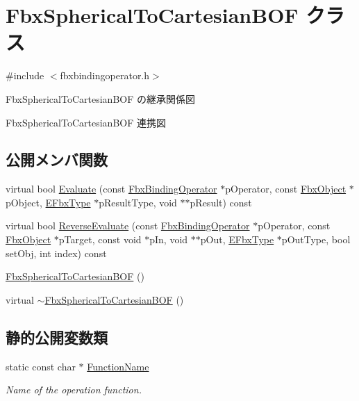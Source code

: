 \hypertarget{class_fbx_spherical_to_cartesian_b_o_f}{}\section{Fbx\+Spherical\+To\+Cartesian\+B\+OF クラス}
\label{class_fbx_spherical_to_cartesian_b_o_f}


{\ttfamily \#include $<$fbxbindingoperator.\+h$>$}



Fbx\+Spherical\+To\+Cartesian\+B\+OF の継承関係図


Fbx\+Spherical\+To\+Cartesian\+B\+OF 連携図
\subsection*{公開メンバ関数}
\begin{DoxyCompactItemize}
\item 
virtual bool \hyperlink{class_fbx_spherical_to_cartesian_b_o_f_a0c53f8982c1e6c6ca7772ab2503f7d2d}{Evaluate} (const \hyperlink{class_fbx_binding_operator}{Fbx\+Binding\+Operator} $\ast$p\+Operator, const \hyperlink{class_fbx_object}{Fbx\+Object} $\ast$p\+Object, \hyperlink{fbxpropertytypes_8h_a73913a5ddfb20e57c6f25e9e6784bd92}{E\+Fbx\+Type} $\ast$p\+Result\+Type, void $\ast$$\ast$p\+Result) const
\item 
virtual bool \hyperlink{class_fbx_spherical_to_cartesian_b_o_f_a05d7c7e0e46df48e22f01f0b09a86bae}{Reverse\+Evaluate} (const \hyperlink{class_fbx_binding_operator}{Fbx\+Binding\+Operator} $\ast$p\+Operator, const \hyperlink{class_fbx_object}{Fbx\+Object} $\ast$p\+Target, const void $\ast$p\+In, void $\ast$$\ast$p\+Out, \hyperlink{fbxpropertytypes_8h_a73913a5ddfb20e57c6f25e9e6784bd92}{E\+Fbx\+Type} $\ast$p\+Out\+Type, bool set\+Obj, int index) const
\item 
\hyperlink{class_fbx_spherical_to_cartesian_b_o_f_a6a34b2c35046672a7ed9f9edf68cfebb}{Fbx\+Spherical\+To\+Cartesian\+B\+OF} ()
\item 
virtual \hyperlink{class_fbx_spherical_to_cartesian_b_o_f_a1521a286e12379f2f0f4b6f67b7f11eb}{$\sim$\+Fbx\+Spherical\+To\+Cartesian\+B\+OF} ()
\end{DoxyCompactItemize}
\subsection*{静的公開変数類}
\begin{DoxyCompactItemize}
\item 
static const char $\ast$ \hyperlink{class_fbx_spherical_to_cartesian_b_o_f_a17f65fd82d7c31f9233ea2871cc732ad}{Function\+Name}
\begin{DoxyCompactList}\small\item\em Name of the operation function. \end{DoxyCompactList}\end{DoxyCompactItemize}


